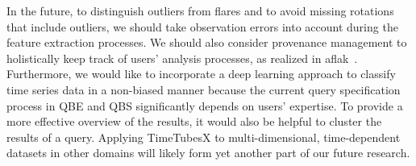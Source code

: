 In the future, 
to distinguish outliers from flares and to avoid missing rotations that include outliers,
we should take observation errors into account during the feature extraction processes. 
We should also consider provenance management to holistically keep track of users’ analysis processes, as realized in aflak~\cite{Boussejra2019}.
Furthermore, we would like to incorporate a deep learning approach to classify time series data in a non-biased manner because the current query specification process in QBE and QBS significantly depends on users' expertise.
To provide a more effective overview of the results, it would also be helpful to cluster the results of a query. %
Applying TimeTubesX to multi-dimensional, time-dependent datasets in other domains will likely form yet another part of our future research.